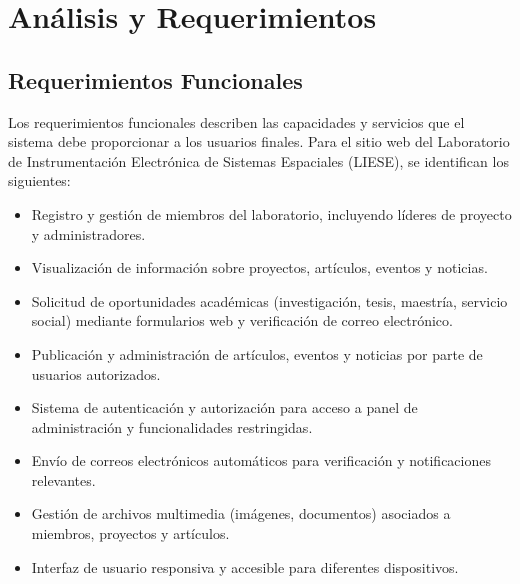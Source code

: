 \chapter{Análisis y Requerimientos}
\section{Requerimientos Funcionales}
Los requerimientos funcionales describen las capacidades y servicios que el sistema debe proporcionar a los usuarios finales. Para el sitio web del Laboratorio de Instrumentación Electrónica de Sistemas Espaciales (LIESE), se identifican los siguientes:
\begin{itemize}
	\item Registro y gestión de miembros del laboratorio, incluyendo líderes de proyecto y administradores.
	\item Visualización de información sobre proyectos, artículos, eventos y noticias.
	\item Solicitud de oportunidades académicas (investigación, tesis, maestría, servicio social) mediante formularios web y verificación de correo electrónico.
	\item Publicación y administración de artículos, eventos y noticias por parte de usuarios autorizados.
	\item Sistema de autenticación y autorización para acceso a panel de administración y funcionalidades restringidas.
	\item Envío de correos electrónicos automáticos para verificación y notificaciones relevantes.
	\item Gestión de archivos multimedia (imágenes, documentos) asociados a miembros, proyectos y artículos.
	\item Interfaz de usuario responsiva y accesible para diferentes dispositivos.
\end{itemize}
